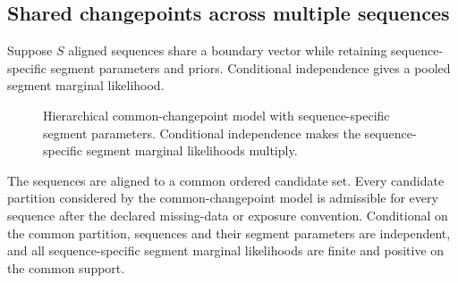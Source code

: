 

\subsection{Shared changepoints across multiple sequences}
Suppose $S$ aligned sequences share a boundary vector while retaining sequence-specific segment parameters and priors. Conditional independence gives a pooled segment marginal likelihood.

\begin{figure}[!htbp]
  \centering
  \resizebox{0.96\columnwidth}{!}{}
  \caption{Hierarchical common-changepoint model with sequence-specific segment parameters. Conditional independence makes the sequence-specific segment marginal likelihoods multiply.}
  \label{fig:shared-boundary-paper}
\end{figure}

\begin{assumption}
\label{ass:shared-support}
The sequences are aligned to a common ordered candidate set. Every candidate partition considered by the common-changepoint model is admissible for every sequence after the declared missing-data or exposure convention. Conditional on the common partition, sequences and their segment parameters are independent, and all sequence-specific segment marginal likelihoods are finite and positive on the common support.
\end{assumption}

